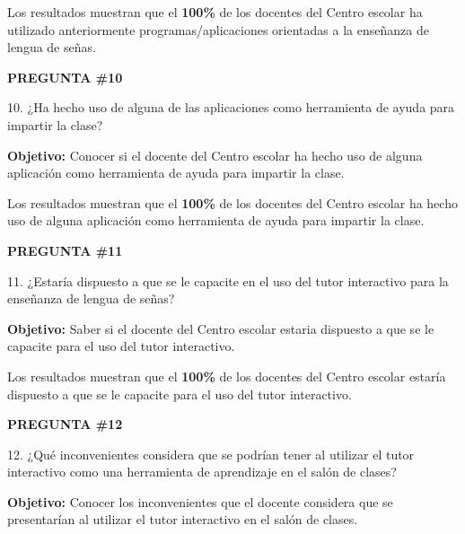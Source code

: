 \documentclass[12pt]{report}%
\begin{document}
Los resultados muestran que el \textbf{ 100\%} de los docentes del Centro escolar ha utilizado anteriormente programas/aplicaciones orientadas a la enseñanza de lengua de señas.


\newpage
\textbf{PREGUNTA \#10}

10. ¿Ha hecho uso de alguna de las aplicaciones como herramienta de ayuda para impartir la clase?

\textbf{Objetivo:} Conocer si el docente del Centro escolar ha hecho uso de alguna aplicación como herramienta de ayuda para impartir la clase.

\begin{center}
\end{center}


Los resultados muestran que el \textbf{ 100\%} de los docentes del Centro escolar ha hecho uso de alguna aplicación como herramienta de ayuda para impartir la clase.

\newpage
\textbf{PREGUNTA \#11}

11. ¿Estaría dispuesto a que se le capacite en el uso del tutor interactivo para la enseñanza de lengua de señas?

\textbf{Objetivo:} Saber si el docente del Centro escolar estaria dispuesto a que se le capacite para el uso del tutor interactivo.
\begin{center}
\end{center}


Los resultados muestran que el \textbf{ 100\%} de los docentes del Centro escolar estaría dispuesto a que se le capacite para el uso del tutor interactivo.


\newpage
\textbf{PREGUNTA \#12}

12. ¿Qué inconvenientes considera que se podrían tener al utilizar el tutor interactivo como una herramienta de aprendizaje en el salón de clases?

\textbf{Objetivo:} Conocer los inconvenientes que el docente considera que se presentarían al utilizar el tutor interactivo en el salón de clases.
\begin{center}
\end{center}
\end{document}
